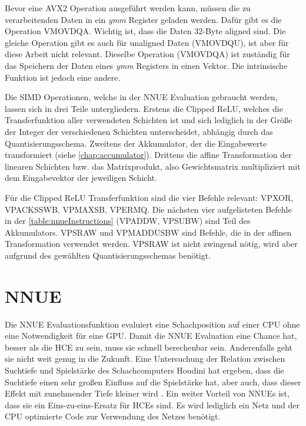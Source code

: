 Bevor eine \ac{AVX2} Operation ausgeführt werden kann, müssen die zu verarbeitenden Daten in ein \emph{ymm} Register geladen werden. Dafür gibt es die Operation VMOVDQA. Wichtig ist, dass die Daten 32-Byte aligned sind. Die gleiche Operation gibt es auch für unaligned Daten (VMOVDQU), ist aber für diese Arbeit nicht relevant. Dieselbe Operation (VMOVDQA) ist zuständig für das Speichern der Daten eines \emph{ymm} Registers in einen Vektor. Die intrinsische Funktion ist jedoch eine andere.

Die \ac{SIMD} Operationen, welche in der \ac{NNUE} Evaluation gebraucht werden, lassen sich in drei Teile untergliedern. Erstens die Clipped \ac{ReLU}, welches die Transferfunktion aller verwendeten Schichten ist und sich lediglich in der Größe der Integer der verschiedenen Schichten unterscheidet, abhängig durch das Quantisierungsschema. Zweitens der Akkumulator, der die Eingabewerte transformiert (siehe \autoref{chap:accumulator}). Drittens die affine Transformation der linearen Schichten bzw. das Matrixprodukt, also Gewichtsmatrix multipliziert mit dem Eingabevektor der jeweiligen Schicht.

Für die Clipped \ac{ReLU} Transferfunktion sind die vier Befehle relevant: VPXOR, VPACKSSWB, VPMAXSB, VPERMQ. Die nächsten vier aufgelisteten Befehle in der \autoref{table:nnueInstructions} (VPADDW, VPSUBW) sind Teil des Akkumulators. VPSRAW und VPMADDUSBW sind Befehle, die in der affinen Transformation verwendet werden. VPSRAW ist nicht zwingend nötig, wird aber aufgrund des gewählten Quantisierungsschemas benötigt.



\section{NNUE}

Die \ac{NNUE} Evaluationsfunktion evaluiert eine Schachposition auf einer CPU ohne eine Notwendigkeit für eine GPU. Damit die \ac{NNUE} Evaluation eine Chance hat, besser als die \ac{HCE} zu sein, muss sie schnell berechenbar sein. Anderenfalls geht sie nicht weit genug in die Zukunft. Eine Untersuchung der Relation zwischen Suchtiefe und Spielstärke des Schachcomputers Houdini \citeyear{Ferreira2013} hat ergeben, dass die Suchtiefe einen sehr großen Einfluss auf die Spielstärke hat, aber auch, dass dieser Effekt mit zunehmender Tiefe kleiner wird \cite{Ferreira2013}. Ein weiter Vorteil von \acp{NNUE} ist, dass sie ein Eins-zu-eins-Ersatz für \acp{HCE} sind. Es wird lediglich ein Netz und der CPU optimierte Code zur Verwendung des Netzes benötigt.

